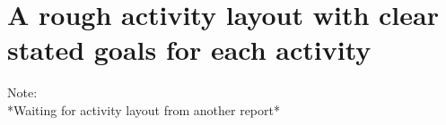 \section{A rough activity layout with clear stated goals for each activity}
Note:\\
*Waiting for activity layout from another report*